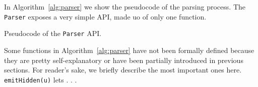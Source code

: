 In Algorithm~\ref{alg:parser} we show the pseudocode of the parsing process.
%
The \texttt{Parser} exposes a very simple API, made uo of only one function.

\begin{algorithm}[t]

 {
	
	
	
	
	
}

\caption{Pseudocode of the \texttt{Parser} API.}
\label{alg:parser}
\end{algorithm}

Some functions in Algorithm~\ref{alg:parser} have not been formally defined because they are pretty self-explanatory or have been partially introduced in previous sections.
For reader's sake, we briefly describe the most important ones here.  \texttt{emitHidden(u)} lets . . .